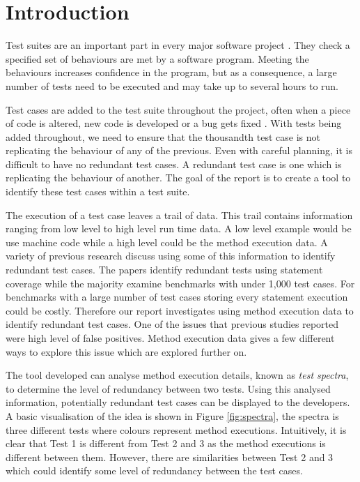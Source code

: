 \chapter{Introduction}\label{C:intro}

Test suites are an important part in every major software project \cite{jeffrey2005test}. They check a specified set of behaviours are met by a software program. Meeting the behaviours increases confidence in the program, but as a consequence, a large number of tests need to be executed and may take up to several hours to run.

Test cases are added to the test suite throughout the project, often when a piece of code is altered, new code is developed or a bug gets fixed \cite{issuetrack,whentotest}. With tests being added throughout, we need to ensure that the thousandth test case is not replicating the behaviour of any of the previous. Even with careful planning, it is difficult to have no redundant test cases. A redundant test case is one which is replicating the behaviour of another.  The goal of the report is to create a tool to identify these test cases within a test suite.

The execution of a test case leaves a trail of data. This trail contains information ranging from low level to high level run time data. A low level example would be use machine code while a high level could be the method execution data. A variety of previous research \cite{wong1995effect, wong1999test, rothermel1998empirical, rothermel2002empirical,koochakzadeh2009test,zhang2011empirical,li2008static} discuss using some of this information to identify redundant test cases. The papers identify redundant tests using statement coverage while the majority examine benchmarks with under 1,000 test cases. For benchmarks with a large number of test cases storing every statement execution could be costly. Therefore our report investigates using method execution data to identify redundant test cases. One of the issues that previous studies reported were high level of false positives. Method execution data gives a few different ways to explore this issue which are explored further on. 

The tool developed can analyse method execution details, known as \textit{test spectra}, to determine the level of redundancy between two tests. Using this analysed information, potentially redundant test cases can be displayed to the developers. A basic visualisation of the idea is shown in Figure \ref{fig:spectra}, the spectra is three different tests where colours represent method executions. Intuitively, it is clear that Test 1 is different from Test 2 and 3 as the method executions is different between them. However, there are similarities between Test 2 and 3 which could identify some level of redundancy between the test cases. 

